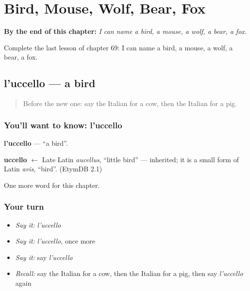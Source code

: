 
\chapter{Bird, Mouse, Wolf, Bear, Fox}
\label{ch:it-bird-mouse-wolf-bear-fox}

\begin{chapteropening}
\textbf{By the end of this chapter:} \emph{I can name a bird, a mouse, a wolf, a bear, a fox.}

Complete the last lesson of chapter 69: I can name a bird, a mouse, a wolf, a bear, a fox.
\end{chapteropening}

\section[l'uccello]{l'uccello — a bird}

\label{lesson:IT-C69-uccello}



\begin{quote}
Before the new one: say the Italian for a cow, then the Italian for a pig.
\end{quote}

\subsection*{You'll want to know: l'uccello}
\textbf{l'uccello} — \textquotedblleft{}a bird\textquotedblright{}.

\begin{cousinweb}
\textbf{uccello} $\leftarrow$ Late Latin \emph{aucellus}, \textquotedblleft{}little bird\textquotedblright{} — inherited; it is a small form of Latin \emph{avis}, \textquotedblleft{}bird\textquotedblright{}. (EtymDB 2.1)
\end{cousinweb}

\begin{grammarlens}[title={What you've built}]
One more word for this chapter.
\end{grammarlens}

\subsection*{Your turn}
\begin{itemize}
\raggedright
  \item \emph{Say it:} \emph{l'uccello}
  \item \emph{Say it:} \emph{l'uccello}, once more
  \item \emph{Say it:} say \emph{l'uccello}
  \item \emph{Recall:} say the Italian for a cow, then the Italian for a pig, then say \emph{l'uccello} again
\end{itemize}

